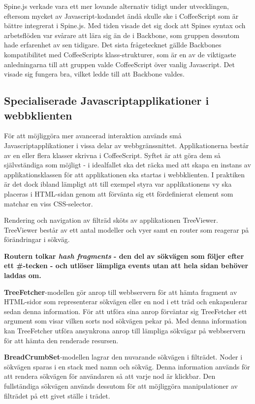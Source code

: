 Spine.js verkade vara ett mer lovande alternativ tidigt under utvecklingen, eftersom mycket av Javascript-kodandet ändå skulle ske i CoffeeScript som är bättre integrerat i Spine.js. Med tiden visade det sig dock att Spines syntax och arbetsflöden var svårare att lära sig än de i Backbone, som gruppen dessutom hade erfarenhet av sen tidigare. Det sista frågetecknet gällde Backbones kompatibilitet med CoffeeScripts klass-strukturer, som är en av de viktigaste anledningarna till att gruppen valde CoffeeScript över vanlig Javascript. Det visade sig fungera bra, vilket ledde till att Backbone valdes.

\subsection{Specialiserade Javascriptapplikationer i webbklienten}
För att möjliggöra mer avancerad interaktion används små Javascriptapplikationer i vissa delar av webbgränssnittet. Applikationerna består av en eller flera klasser skrivna i CoffeeScript. Syftet är att göra dem så självständiga som möjligt - i idealfallet ska det räcka med att skapa en instans av applikationsklassen för att applikationen ska startas i webbklienten. I praktiken är det dock ibland lämpligt att till exempel styra var applikationens vy ska placeras i HTML-sidan genom att förvänta sig ett fördefinierat element som matchar en viss CSS-selector.

Rendering och navigation av filträd sköts av applikationen TreeViewer. TreeViewer består av ett antal modeller och vyer samt en router som reagerar på förändringar i sökväg. 

\bf{Routern} tolkar \emph{hash fragments} - den del av sökvägen som följer efter ett \#-tecken - och utlöser lämpliga events utan att hela sidan behöver laddas om.

{\bf TreeFetcher}-modellen gör anrop till webbservern för att hämta fragment av HTML-sidor som representerar sökvägen eller en nod i ett träd och enkapsulerar sedan denna information. För att utföra sina anrop förväntar sig TreeFetcher ett argument som visar vilken sorts nod sökvägen pekar på. Med denna information kan TreeFetcher utföra ansynkrona anrop till lämpliga sökvägar på webbservern för att hämta den renderade resursen.

{\bf BreadCrumbSet}-modellen lagrar den nuvarande sökvägen i filträdet. Noder i sökvägen sparas i en stack med namn och sökväg. Denna information används för att rendera sökvägen för användaren så att varje nod är klickbar. Den fullständiga sökvägen används dessutom för att möjliggöra manipulationer av filträdet på ett givet ställe i trädet.

